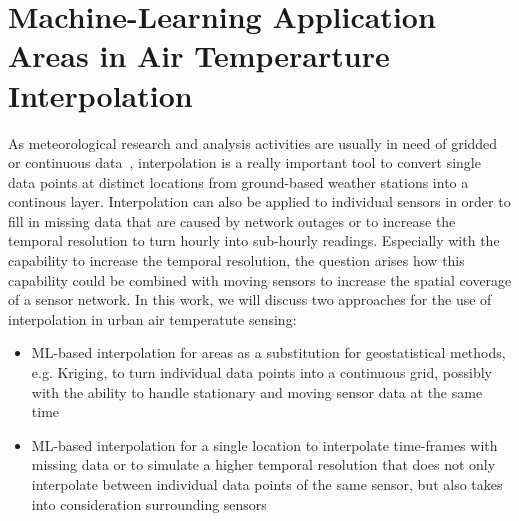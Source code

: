 \section{Machine-Learning Application Areas in Air Temperarture Interpolation}

As meteorological research and analysis activities are usually in need of gridded or continuous data~\cite{sekulic2020spatio}, interpolation is a really important tool to convert single data points at distinct locations from ground-based weather stations into a continous layer. Interpolation can also be applied to individual sensors in order to fill in missing data that are caused by network outages or to increase the temporal resolution to turn hourly into sub-hourly readings. Especially with the capability to increase the temporal resolution, the question arises how this capability could be combined with moving sensors to increase the spatial coverage of a sensor network. In this work, we will discuss two approaches for the use of interpolation in urban air temperatute sensing:

\begin{itemize}
    \item ML-based interpolation for areas as a substitution for geostatistical methods, e.g. Kriging, to turn individual data points into a continuous grid, possibly with the ability to handle stationary and moving sensor data at the same time
    \item ML-based interpolation for a single location to interpolate time-frames with missing data or to simulate a higher temporal resolution that does not only interpolate between individual data points of the same sensor, but also takes into consideration surrounding sensors
\end{itemize}

